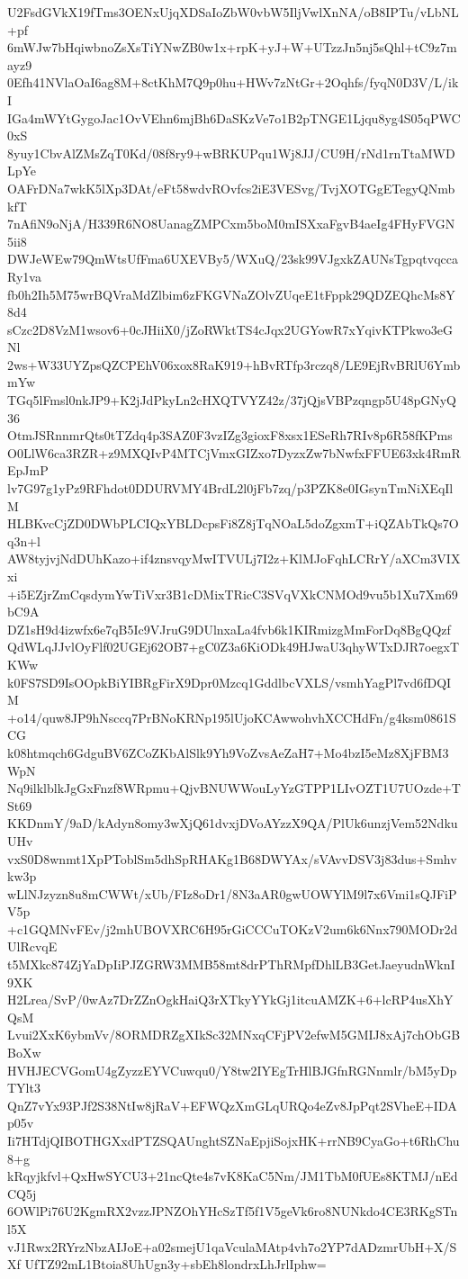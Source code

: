 U2FsdGVkX19fTms3OENxUjqXDSaIoZbW0vbW5IljVwlXnNA/oB8IPTu/vLbNL+pf
6mWJw7bHqiwbnoZsXsTiYNwZB0w1x+rpK+yJ+W+UTzzJn5nj5sQhl+tC9z7mayz9
0Efh41NVlaOaI6ag8M+8ctKhM7Q9p0hu+HWv7zNtGr+2Oqhfs/fyqN0D3V/L/ikI
IGa4mWYtGygoJac1OvVEhn6mjBh6DaSKzVe7o1B2pTNGE1Ljqu8yg4S05qPWC0xS
8yuy1CbvAlZMsZqT0Kd/08f8ry9+wBRKUPqu1Wj8JJ/CU9H/rNd1rnTtaMWDLpYe
OAFrDNa7wkK5lXp3DAt/eFt58wdvROvfcs2iE3VESvg/TvjXOTGgETegyQNmbkfT
7nAfiN9oNjA/H339R6NO8UanagZMPCxm5boM0mISXxaFgvB4aeIg4FHyFVGN5ii8
DWJeWEw79QmWtsUfFma6UXEVBy5/WXuQ/23sk99VJgxkZAUNsTgpqtvqccaRy1va
fb0h2Ih5M75wrBQVraMdZlbim6zFKGVNaZOlvZUqeE1tFppk29QDZEQhcMs8Y8d4
sCzc2D8VzM1wsov6+0cJHiiX0/jZoRWktTS4cJqx2UGYowR7xYqivKTPkwo3eGNl
2ws+W33UYZpsQZCPEhV06xox8RaK919+hBvRTfp3rczq8/LE9EjRvBRlU6YmbmYw
TGq5lFmsl0nkJP9+K2jJdPkyLn2cHXQTVYZ42z/37jQjsVBPzqngp5U48pGNyQ36
OtmJSRnnmrQts0tTZdq4p3SAZ0F3vzIZg3gioxF8xsx1ESeRh7RIv8p6R58fKPms
O0LlW6ca3RZR+z9MXQIvP4MTCjVmxGIZxo7DyzxZw7bNwfxFFUE63xk4RmREpJmP
lv7G97g1yPz9RFhdot0DDURVMY4BrdL2l0jFb7zq/p3PZK8e0IGsynTmNiXEqIlM
HLBKvcCjZD0DWbPLCIQxYBLDcpsFi8Z8jTqNOaL5doZgxmT+iQZAbTkQs7Oq3n+l
AW8tyjvjNdDUhKazo+if4znsvqyMwITVULj7I2z+KlMJoFqhLCRrY/aXCm3VIXxi
+i5EZjrZmCqsdymYwTiVxr3B1cDMixTRicC3SVqVXkCNMOd9vu5b1Xu7Xm69bC9A
DZ1sH9d4izwfx6e7qB5Ic9VJruG9DUlnxaLa4fvb6k1KIRmizgMmForDq8BgQQzf
QdWLqJJvlOyFlf02UGEj62OB7+gC0Z3a6KiODk49HJwaU3qhyWTxDJR7oegxTKWw
k0FS7SD9IsOOpkBiYIBRgFirX9Dpr0Mzcq1GddlbcVXLS/vsmhYagPl7vd6fDQIM
+o14/quw8JP9hNsccq7PrBNoKRNp195lUjoKCAwwohvhXCCHdFn/g4ksm0861SCG
k08htmqch6GdguBV6ZCoZKbAlSlk9Yh9VoZvsAeZaH7+Mo4bzI5eMz8XjFBM3WpN
Nq9ilklblkJgGxFnzf8WRpmu+QjvBNUWWouLyYzGTPP1LIvOZT1U7UOzde+TSt69
KKDnmY/9aD/kAdyn8omy3wXjQ61dvxjDVoAYzzX9QA/PlUk6unzjVem52NdkuUHv
vxS0D8wnmt1XpPToblSm5dhSpRHAKg1B68DWYAx/sVAvvDSV3j83dus+Smhvkw3p
wLlNJzyzn8u8mCWWt/xUb/FIz8oDr1/8N3aAR0gwUOWYlM9l7x6Vmi1sQJFiPV5p
+c1GQMNvFEv/j2mhUBOVXRC6H95rGiCCCuTOKzV2um6k6Nnx790MODr2dUlRcvqE
t5MXkc874ZjYaDpIiPJZGRW3MMB58mt8drPThRMpfDhlLB3GetJaeyudnWknI9XK
H2Lrea/SvP/0wAz7DrZZnOgkHaiQ3rXTkyYYkGj1itcuAMZK+6+lcRP4usXhYQsM
Lvui2XxK6ybmVv/8ORMDRZgXIkSc32MNxqCFjPV2efwM5GMIJ8xAj7chObGBBoXw
HVHJECVGomU4gZyzzEYVCuwqu0/Y8tw2IYEgTrHlBJGfnRGNnmlr/bM5yDpTYlt3
QnZ7vYx93PJf2S38NtIw8jRaV+EFWQzXmGLqURQo4eZv8JpPqt2SVheE+IDAp05v
Ii7HTdjQIBOTHGXxdPTZSQAUnghtSZNaEpjiSojxHK+rrNB9CyaGo+t6RhChu8+g
kRqyjkfvl+QxHwSYCU3+21ncQte4s7vK8KaC5Nm/JM1TbM0fUEs8KTMJ/nEdCQ5j
6OWlPi76U2KgmRX2vzzJPNZOhYHcSzTf5f1V5geVk6ro8NUNkdo4CE3RKgSTnl5X
vJ1Rwx2RYrzNbzAIJoE+a02smejU1qaVculaMAtp4vh7o2YP7dADzmrUbH+X/SXf
UfTZ92mL1Btoia8UhUgn3y+sbEh8londrxLhJrlIphw=
